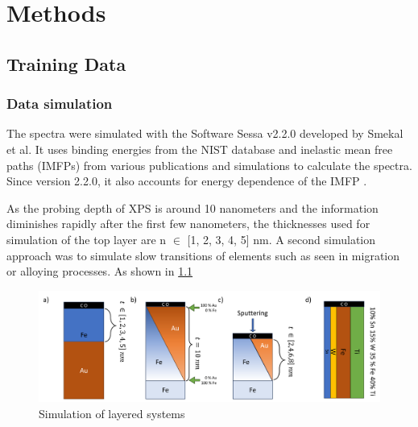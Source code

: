 


\chapter{Methods} %

\label{Chapter3} %


\section{Training Data}



\subsection{Data simulation}

The spectra were simulated with the Software Sessa v2.2.0 developed by Smekal et al. It uses binding energies from the NIST database and inelastic mean free paths (IMFPs) from various publications and simulations to calculate the spectra. Since version 2.2.0, it also accounts for energy dependence of the IMFP \cite{noauthor_nist_2010}.

As the probing depth of XPS is around 10 nanometers and the information diminishes rapidly after the first few nanometers, the thicknesses used for simulation of the top layer are n $\in$ [1, 2, 3, 4, 5] nm. A second simulation approach was to simulate slow transitions of elements such as seen in migration or alloying processes. As shown in \ref{fig:layers}

\begin{figure}
    \centering
    \includegraphics[scale=0.4]{Figures/layers.png}
    \caption{Simulation of layered systems}
    \label{fig:layers}
\end{figure}


